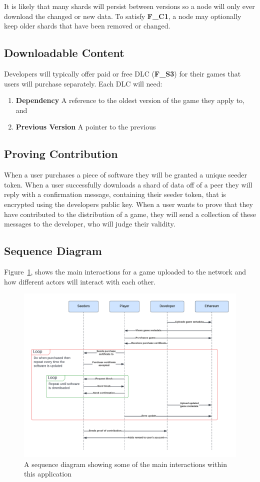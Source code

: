 \noindent It is likely that many shards will persist between versions so a node will only ever download the changed or new data. To satisfy \textbf{F\_C1}, a node may optionally keep older shards that have been removed or changed.

\subsection*{Downloadable Content}

Developers will typically offer paid or free DLC (\textbf{F\_S3}) for their games that users will purchase separately. Each DLC will need:

\begin{enumerate}
  \item \textbf{Dependency} A reference to the oldest version of the game they apply to, and
  \item \textbf{Previous Version} A pointer to the previous
\end{enumerate}

\subsection*{Proving Contribution}

When a user purchases a piece of software they will be granted a unique seeder token. When a user successfully downloads a shard of data off of a peer they will reply with a confirmation message, containing their seeder token, that is encrypted using the developers public key. 
When a user wants to prove that they have contributed to the distribution of a game, they will send a collection of these messages to the developer, who will judge their validity.

\subsection*{Sequence Diagram}

Figure~\ref{fig:sequence-diagram}, shows the main interactions for a game uploaded to the network and how different actors will interact with each other.

\begin{figure}[ht]
  \centering
  \includegraphics[width=.95\textwidth]{assets/images/diagrams/seqeunce-diagram.png}
  \caption{A sequence diagram showing some of the main interactions within this application}
  \label{fig:sequence-diagram}
\end{figure}
